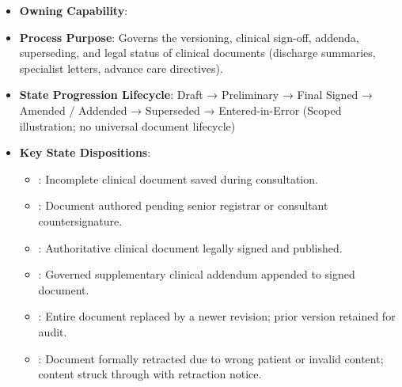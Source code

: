 \begin{itemize}

\item
\textbf{Owning Capability}: \texttt{}



\item
\textbf{Process Purpose}: Governs the versioning, clinical sign-off, addenda, superseding, and legal status of clinical documents (discharge summaries, specialist letters, advance care directives).



\item
\textbf{State Progression Lifecycle}: Draft → Preliminary → Final Signed → Amended /\allowbreak{} Addended → Superseded → Entered-in-Error   (Scoped illustration; no universal document lifecycle)



\item
\textbf{Key State Dispositions}:


\begin{itemize}

\item
\texttt{}: Incomplete clinical document saved during consultation.



\item
\texttt{}: Document authored pending senior registrar or consultant countersignature.



\item
\texttt{}: Authoritative clinical document legally signed and published.



\item
\texttt{}: Governed supplementary clinical addendum appended to signed document.



\item
\texttt{}: Entire document replaced by a newer revision; prior version retained for audit.



\item
\texttt{}: Document formally retracted due to wrong patient or invalid content; content struck through with retraction notice.




\end{itemize}
\end{itemize}
